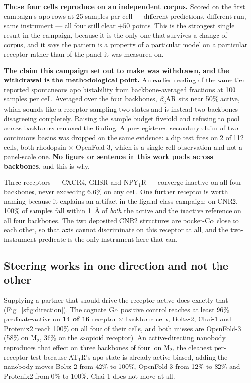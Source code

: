 \textbf{Those four cells reproduce on an independent corpus.} Scored on the
first campaign's apo rows at 25 samples per cell --- different predictions,
different run, same instrument --- all four still clear $+50$ points. This is
the strongest single result in the campaign, because it is the only one that
survives a change of corpus, and it says the pattern is a property of a
particular model on a particular receptor rather than of the panel it was
measured on.

\textbf{The claim this campaign set out to make was withdrawn, and the
withdrawal is the methodological point.} An earlier reading of the same tier
reported spontaneous apo bistability from backbone-averaged fractions at 100
samples per cell. Averaged over the four backbones, $\beta_2$AR sits near 50\%
active, which sounds like a receptor sampling two states and is instead two
backbones disagreeing completely. Raising the sample budget fivefold and
refusing to pool across backbones removed the finding. A pre-registered
secondary claim of two continuous basins was dropped on the same evidence: a
dip test fires on 2 of 112 cells, both rhodopsin $\times$ OpenFold-3, which is
a single-cell observation and not a panel-scale one. \textbf{No figure or
sentence in this work pools across backbones}, and this is why.

Three receptors --- CXCR4, GHSR and NPY$_1$R --- converge inactive on all four
backbones, never exceeding 6.6\% on any cell. One further receptor is worth
naming because it explains an artifact in the ligand-class campaign: on CNR2,
100\% of samples fall within 1~\AA{} of \emph{both} the active and the inactive
reference on all four backbones. The two deposited CNR2 structures are
pocket-C$\alpha$ close to each other, so that axis cannot discriminate on this
receptor at all, and the two-instrument predicate is the only instrument here
that can.

\subsection*{Steering works in one direction and not the other}

Supplying a partner that should drive the receptor active does exactly that
(Fig.~\ref{sfig:direction}). The cognate G$\alpha$ positive control
reaches at least 96\% predicate-active on \textbf{14 of 16} receptor $\times$
backbone cells; Boltz-2, Chai-1 and Protenix2 reach 100\% on all four of their
cells, and both misses are OpenFold-3 (58\% on M$_2$, 36\% on the
$\kappa$-opioid receptor). An active-directing nanobody reproduces that effect
on three backbones of four: on M$_2$, the cleanest per-receptor test because
AT$_1$R's apo state is already active-biased, adding the nanobody moves Boltz-2
from 42\% to 100\%, OpenFold-3 from 12\% to 82\% and Protenix2 from 0\% to
100\%. Chai-1 does not move at all.

